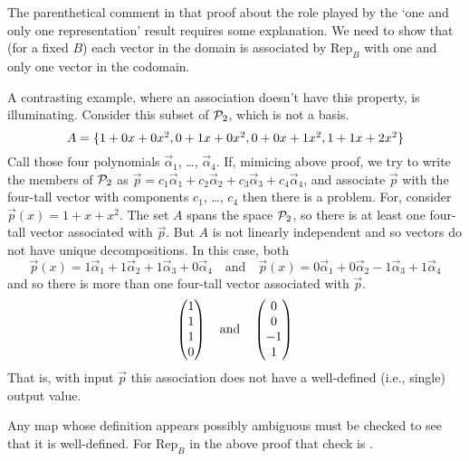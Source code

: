 \begin{remark} \label{not:WellDefFcns}
The parenthetical comment in that proof
about the role played by the `one and only one representation' result 
requires some explanation.
We need to show that (for a fixed $B$) 
each vector in the domain is associated by 
$\mbox{Rep}_B$ with one and only one vector in the codomain.

A contrasting example, where an association doesn't have this property, 
is illuminating.
Consider this subset of \( \mathcal{P}_2 \), which is not a basis.
\begin{equation*}
 A=\mbox{$\{1+0x+0x^2,
              0+1x+0x^2,
              0+0x+1x^2,
              1+1x+2x^2\}$}
\end{equation*}
Call those four polynomials $\vec{\alpha}_1$, \ldots, $\vec{\alpha}_4$.
If, mimicing above proof,
we try to write the members of $\mathcal{P}_2$ as 
\( \vec{p}=c_1\vec{\alpha}_1+c_2\vec{\alpha}_2+
             c_3\vec{\alpha}_3+c_4\vec{\alpha}_4 \),
and associate $\vec{p}$ with the four-tall vector with components
$c_1$, \ldots, $c_4$ then there is a problem. 
For, consider \( \vec{p}(x)=1+x+x^2 \).
The set $A$ spans the space $\mathcal{P}_2$, 
so there is at least one four-tall vector associated with $\vec{p}$.
But $A$ is not linearly independent and so vectors do not have unique
decompositions.
In this case, both
\begin{equation*}
  \vec{p}(x)=1\vec{\alpha}_1+1\vec{\alpha}_2+1\vec{\alpha}_3+0\vec{\alpha}_4 
  \quad\text{and}\quad
  \vec{p}(x)=0\vec{\alpha}_1+0\vec{\alpha}_2-
                1\vec{\alpha}_3+1\vec{\alpha}_4 
\end{equation*}
and so there is more than one four-tall vector associated with $\vec{p}$.
\begin{equation*}
  \begin{pmatrix} 1 \\ 1 \\ 1 \\ 0 \end{pmatrix}
  \quad\text{and}\quad
  \begin{pmatrix} 0 \\ 0 \\ -1 \\ 1 \end{pmatrix}
\end{equation*}
That is,
with input $\vec{p}$ this association does not have a 
well-defined (i.e., single) output value.

Any map whose definition appears possibly ambiguous must be checked to 
see that it is well-defined.
For $\mbox{Rep}_B$ in the above proof 
that check is .
\end{remark}

